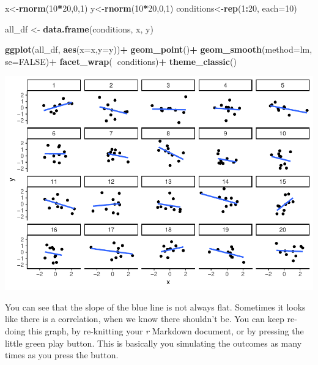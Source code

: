 \documentclass[]{book}
\newenvironment{Shaded}{\begin{snugshade}}{\end{snugshade}}
\newcommand{\KeywordTok}[1]{\textcolor[rgb]{0.13,0.29,0.53}{\textbf{#1}}}
\newcommand{\DataTypeTok}[1]{\textcolor[rgb]{0.13,0.29,0.53}{#1}}
\newcommand{\DecValTok}[1]{\textcolor[rgb]{0.00,0.00,0.81}{#1}}
\newcommand{\StringTok}[1]{\textcolor[rgb]{0.31,0.60,0.02}{#1}}
\newcommand{\OtherTok}[1]{\textcolor[rgb]{0.56,0.35,0.01}{#1}}
\newcommand{\OperatorTok}[1]{\textcolor[rgb]{0.81,0.36,0.00}{\textbf{#1}}}
\newcommand{\NormalTok}[1]{#1}
\begin{document}
\begin{Shaded}
\begin{Highlighting}[]
\NormalTok{x<-}\KeywordTok{rnorm}\NormalTok{(}\DecValTok{10}\OperatorTok{*}\DecValTok{20}\NormalTok{,}\DecValTok{0}\NormalTok{,}\DecValTok{1}\NormalTok{)}
\NormalTok{y<-}\KeywordTok{rnorm}\NormalTok{(}\DecValTok{10}\OperatorTok{*}\DecValTok{20}\NormalTok{,}\DecValTok{0}\NormalTok{,}\DecValTok{1}\NormalTok{)}
\NormalTok{conditions<-}\KeywordTok{rep}\NormalTok{(}\DecValTok{1}\OperatorTok{:}\DecValTok{20}\NormalTok{, }\DataTypeTok{each=}\DecValTok{10}\NormalTok{)}

\NormalTok{all_df <-}\StringTok{ }\KeywordTok{data.frame}\NormalTok{(conditions, x, y)}

\KeywordTok{ggplot}\NormalTok{(all_df, }\KeywordTok{aes}\NormalTok{(}\DataTypeTok{x=}\NormalTok{x,}\DataTypeTok{y=}\NormalTok{y))}\OperatorTok{+}
\StringTok{  }\KeywordTok{geom_point}\NormalTok{()}\OperatorTok{+}
\StringTok{  }\KeywordTok{geom_smooth}\NormalTok{(}\DataTypeTok{method=}\NormalTok{lm, }\DataTypeTok{se=}\OtherTok{FALSE}\NormalTok{)}\OperatorTok{+}
\StringTok{  }\KeywordTok{facet_wrap}\NormalTok{(}\OperatorTok{~}\NormalTok{conditions)}\OperatorTok{+}
\StringTok{  }\KeywordTok{theme_classic}\NormalTok{()}
\end{Highlighting}
\end{Shaded}

\includegraphics{Statistics_Lab_files/figure-latex/unnamed-chunk-68-1.pdf}

You can see that the slope of the blue line is not always flat.
Sometimes it looks like there is a correlation, when we know there
shouldn't be. You can keep re-doing this graph, by re-knitting your
\emph{r} Markdown document, or by pressing the little green play button.
This is basically you simulating the outcomes as many times as you press
the button.
\end{document}
